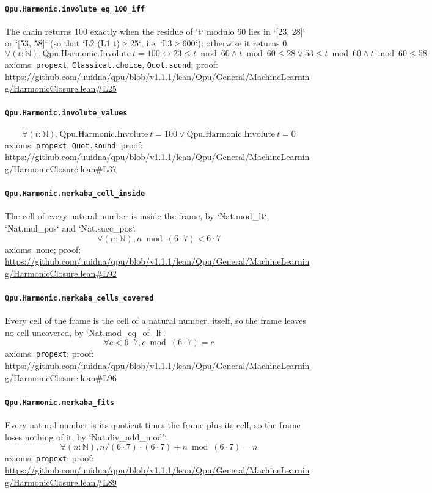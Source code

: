 \documentclass[11pt]{article}
\begin{document}
\paragraph{\texttt{Qpu.Harmonic.involute\_eq\_100\_iff}}
The chain returns 100 exactly when the residue of `t` modulo 60 lies in `[23, 28]` or `[53, 58]` (so that `L2 (L1 t) ≥ 25`, i.e. `L3 ≥ 600`); otherwise it returns 0.
\[ \forall (t : \mathbb{N}), \mathrm{Qpu.Harmonic.Involute}\ t = 100 \leftrightarrow 23 \le t \bmod 60 \land t \bmod 60 \le 28 \lor 53 \le t \bmod 60 \land t \bmod 60 \le 58 \]
\noindent axioms: \texttt{propext}, \texttt{Classical.choice}, \texttt{Quot.sound}; proof: \url{https://github.com/uuidna/qpu/blob/v1.1.1/lean/Qpu/General/MachineLearning/HarmonicClosure.lean\#L25}

\paragraph{\texttt{Qpu.Harmonic.involute\_values}}
\[ \forall (t : \mathbb{N}), \mathrm{Qpu.Harmonic.Involute}\ t = 100 \lor \mathrm{Qpu.Harmonic.Involute}\ t = 0 \]
\noindent axioms: \texttt{propext}, \texttt{Quot.sound}; proof: \url{https://github.com/uuidna/qpu/blob/v1.1.1/lean/Qpu/General/MachineLearning/HarmonicClosure.lean\#L37}

\paragraph{\texttt{Qpu.Harmonic.merkaba\_cell\_inside}}
The cell of every natural number is inside the frame, by `Nat.mod\_lt`, `Nat.mul\_pos` and `Nat.succ\_pos`.
\[ \forall (n : \mathbb{N}), n \bmod (6 \cdot 7) < 6 \cdot 7 \]
\noindent axioms: none; proof: \url{https://github.com/uuidna/qpu/blob/v1.1.1/lean/Qpu/General/MachineLearning/HarmonicClosure.lean\#L92}

\paragraph{\texttt{Qpu.Harmonic.merkaba\_cells\_covered}}
Every cell of the frame is the cell of a natural number, itself, so the frame leaves no cell uncovered, by `Nat.mod\_eq\_of\_lt`.
\[ \forall c < 6 \cdot 7, c \bmod (6 \cdot 7) = c \]
\noindent axioms: \texttt{propext}; proof: \url{https://github.com/uuidna/qpu/blob/v1.1.1/lean/Qpu/General/MachineLearning/HarmonicClosure.lean\#L96}

\paragraph{\texttt{Qpu.Harmonic.merkaba\_fits}}
Every natural number is its quotient times the frame plus its cell, so the frame loses nothing of it, by `Nat.div\_add\_mod'`.
\[ \forall (n : \mathbb{N}), n / (6 \cdot 7) \cdot (6 \cdot 7) + n \bmod (6 \cdot 7) = n \]
\noindent axioms: \texttt{propext}; proof: \url{https://github.com/uuidna/qpu/blob/v1.1.1/lean/Qpu/General/MachineLearning/HarmonicClosure.lean\#L89}
\end{document}
